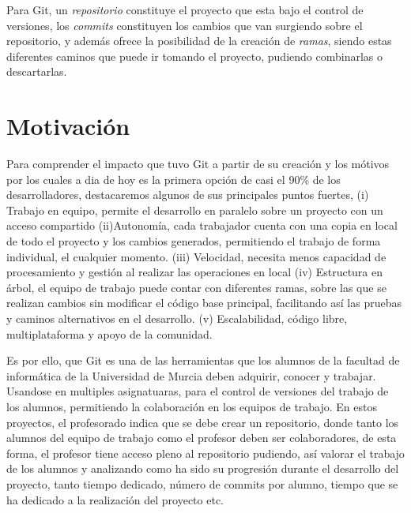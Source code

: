 Para Git, un \textit{repositorio} constituye el proyecto que esta bajo el
control de versiones, los \textit{commits} constituyen los cambios que van
surgiendo sobre el repositorio, y además ofrece la posibilidad de la
creación de \textit{ramas}, siendo estas diferentes caminos que puede ir
tomando el proyecto, pudiendo combinarlas o descartarlas.



\section{Motivación\label{01intro_motivacion}}

Para comprender el impacto que tuvo Git a partir de su creación y los
mótivos por los cuales a dia de hoy es la primera opción de casi el 90\% de
los desarrolladores, destacaremos algunos de sus principales puntos
fuertes, (i) Trabajo en equipo, permite el desarrollo en paralelo sobre un
proyecto con un acceso compartido (ii)Autonomía, cada trabajador cuenta con
una copia en local de todo el proyecto y los cambios generados, permitiendo
el trabajo de forma individual, el cualquier momento. (iii) Velocidad,
necesita menos capacidad de procesamiento y gestión al realizar las
operaciones en local (iv) Estructura en árbol, el equipo de trabajo puede
contar con diferentes ramas, sobre las que se realizan cambios sin
modificar el código base principal, facilitando así las pruebas y caminos
alternativos en el desarrollo. (v) Escalabilidad, código libre,
multiplataforma y apoyo de la comunidad.

Es por ello, que Git es una de las herramientas que los alumnos de la
facultad de informática de la Universidad de Murcia deben adquirir, conocer
y trabajar. Usandose en multiples asignatuaras, para el control de
versiones del trabajo de los alumnos, permitiendo la colaboración en los
equipos de trabajo. En estos proyectos, el profesorado indica que se debe
crear un repositorio, donde tanto los alumnos del equipo de trabajo como el
profesor deben ser colaboradores, de esta forma, el profesor tiene acceso
pleno al repositorio pudiendo, así valorar el trabajo de los alumnos y
analizando como ha sido su progresión durante el desarrollo del proyecto,
tanto tiempo dedicado, número de commits por alumno, tiempo que se ha
dedicado a la realización del proyecto etc.

